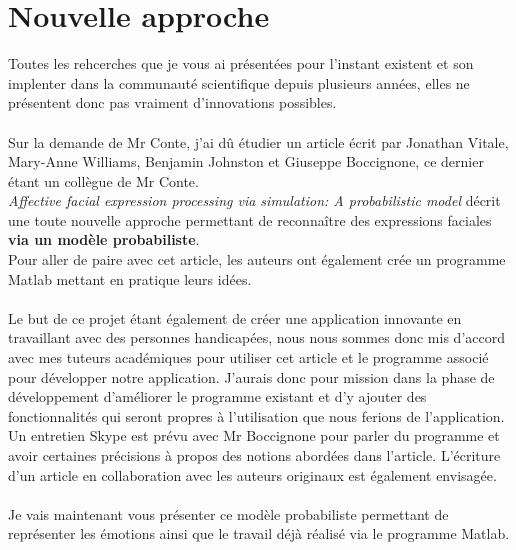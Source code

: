 \documentclass[overfullbox, poster]{polytech/polytech}
\begin{document}
\chapter{Nouvelle approche}
\label{chap:chap_newmodel}
Toutes les rehcerches que je vous ai présentées pour l'instant existent et son implenter dans la communauté scientifique depuis plusieurs années, elles ne présentent donc pas vraiment d'innovations possibles.\\
\\
Sur la demande de Mr Conte, j'ai dû étudier un article écrit par Jonathan Vitale, Mary-Anne Williams, Benjamin Johnston et Giuseppe Boccignone, ce dernier étant un collègue de Mr Conte.\\
\textit{Affective facial expression processing via simulation: A probabilistic model} \cite{italiens} décrit une toute nouvelle approche permettant de reconnaître des expressions faciales \textbf{via un modèle probabiliste}.\\
Pour aller de paire avec cet article, les auteurs ont également crée un programme Matlab mettant en pratique leurs idées.\\
\\
Le but de ce projet étant également de créer une application innovante en travaillant avec des personnes handicapées, nous nous sommes donc mis d'accord avec mes tuteurs académiques pour utiliser cet article et le programme associé pour développer notre application. J'aurais donc pour mission dans la phase de développement d'améliorer le programme existant et d'y ajouter des fonctionnalités qui seront propres à l'utilisation que nous ferions de l'application.\\
Un entretien Skype est prévu avec Mr Boccignone pour parler du programme et avoir certaines précisions à propos des notions abordées dans l'article. L'écriture d'un article en collaboration avec les auteurs originaux est également envisagée.\\
\\
Je vais maintenant vous présenter ce modèle probabiliste permettant de représenter les émotions ainsi que le travail déjà réalisé via le programme Matlab.

\newpage
\end{document}
